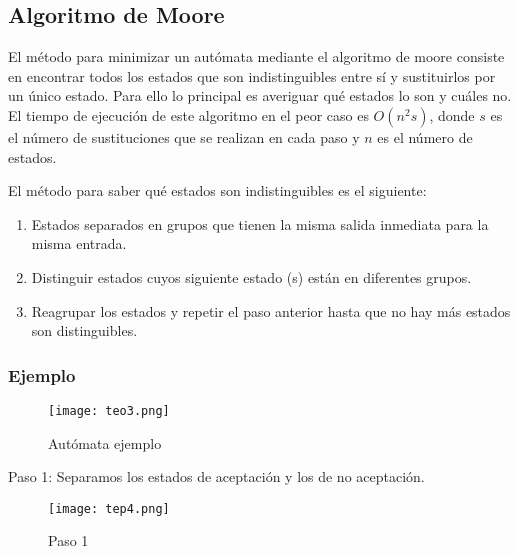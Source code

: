 \documentclass[12pt]{article}
\begin{document}
\newpage
\subsection{Algoritmo de Moore}
El m\'etodo para minimizar un aut\'omata mediante el algoritmo de moore consiste en encontrar todos los estados que son indistinguibles entre s\'i y sustituirlos por un \'unico estado.
Para ello lo principal es averiguar qu\'e estados lo son y cu\'ales no. El tiempo de ejecuci\'on de este algoritmo en el peor caso es $O(n^2s)$, donde $s$ es el n\'umero de sustituciones que se realizan en cada paso y $n$ es el n\'umero de estados. 

El m\'etodo para saber qu\'e estados son indistinguibles es el siguiente: 

\begin{enumerate}
    \item Estados separados en grupos que tienen la misma salida inmediata para la misma entrada.
    \item Distinguir estados cuyos siguiente estado (s) están en diferentes grupos.
    \item Reagrupar los estados y repetir el paso anterior hasta que no hay más estados son distinguibles.
\end{enumerate}


\subsubsection{Ejemplo}
\begin{figure}[h]
    \centering
    \texttt{[image: teo3.png]}
    \caption{Aut\'omata ejemplo}
    \label{fig:my_label}
\end{figure}

Paso 1: Separamos los estados de aceptación y los de no aceptación.
\begin{figure}[h]
    \centering
    \texttt{[image: tep4.png]}
    \caption{Paso 1}
    \label{fig:my_label}
\end{figure}
\end{document}
